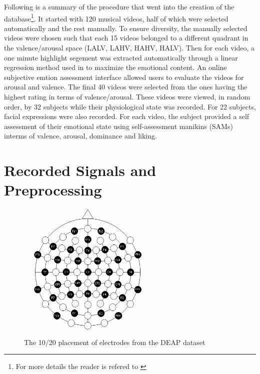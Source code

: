 \documentclass[12pt, a4paper, fleqn]{memoir}%
\begin{document}
Following is a summary of the procedure that went into the creation of the database\footnote{For more details the reader is refered to \cite{koelstra2012deap}}. It started with 120 musical videos, half of which were selected automatically and the rest manually. To ensure diversity, the manually selected videos were chosen such that each 15 videos belonged to a different quadrant in the valence/arousal space (LALV, LAHV, HAHV, HALV). Then for each video, a one minute highlight segement was extracted automatically through a linear regression method used in \cite{soleymani2008bayesian} to maximize the emotional content. An online subjective emtion assessment interface allowed users to evaluate the videos for arousal and valence. The final 40 videos were selected from the ones having the highest rating in terms of valence/arousal. These videos were viewed, in random order, by 32 subjects while their physiological state was recorded. For 22 subjects, facial expressions were also recorded. For each video, the subject provided a self assessment of their emotional state using self-assessment manikins (SAMs) interms of valence, arousal, dominance and liking\cite{koelstra2012deap}.

\section{Recorded Signals and Preprocessing}
\label{sec:preprocessing}

\begin{figure}[h]
	\centering
	\includegraphics[width=0.6\textwidth]{pic.png}
	\caption{The 10/20 placement of electrodes from the DEAP dataset}
	\label{fig:eeg}
\end{figure}
\end{document}
